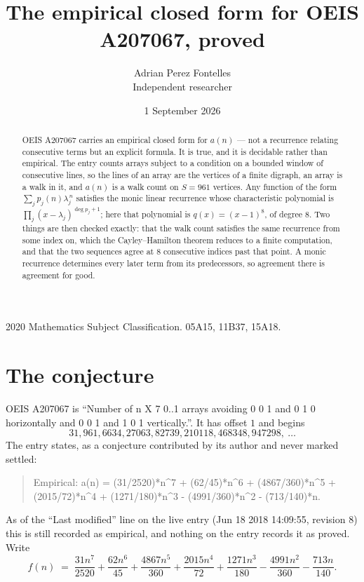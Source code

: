 \documentclass[11pt,a4paper]{article}
\title{The empirical closed form for OEIS A207067, proved}
\author{Adrian Perez Fontelles\\ \small Independent researcher}
\date{1 September 2026}
\theoremstyle{plain}
\theoremstyle{definition}
\begin{document}
\maketitle

\begin{abstract}
OEIS A207067 carries an empirical closed form for $a(n)$ --- not a recurrence relating
consecutive terms but an explicit formula. It is true, and it is decidable rather than
empirical. The entry counts arrays subject to a condition on a bounded window of consecutive lines, so the lines of an array are the
vertices of a finite digraph, an array is a walk in it, and $a(n)$ is a walk count on
$S=961$ vertices. Any function of the form $\sum_j p_j(n)\lambda_j^{\,n}$ satisfies the
monic linear recurrence whose characteristic polynomial is
$\prod_j(x-\lambda_j)^{\deg p_j+1}$; here that polynomial is $q(x)=(x-1)^{8}$, of degree
$8$. Two things are then checked exactly: that the walk count satisfies the same
recurrence from some index on, which the Cayley--Hamilton theorem reduces to a finite
computation, and that the two sequences agree at $8$ consecutive indices past that
point. A monic recurrence determines every later term from its predecessors, so agreement
there is agreement for good.
\end{abstract}

\noindent\small 2020 Mathematics Subject Classification. 05A15, 11B37, 15A18.\normalsize

\section{The conjecture}

OEIS A207067 is ``Number of n X 7 0..1 arrays avoiding 0 0 1 and 0 1 0 horizontally and 0 0 1 and 1 0 1 vertically.''. It has offset $1$ and begins
\[
31, 961, 6634, 27063, 82739, 210118, 468348, 947298,\ \dots
\]
The entry states, as a conjecture contributed by its author and never marked settled:
\begin{quote}
Empirical: a(n) = (31/2520)*n\^{}7 + (62/45)*n\^{}6 + (4867/360)*n\^{}5 + (2015/72)*n\^{}4 + (1271/180)*n\^{}3 - (4991/360)*n\^{}2 - (713/140)*n.
\end{quote}
As of the ``Last modified'' line on the live entry (Jun 18 2018 14:09:55, revision 8) this is still
recorded as empirical, and nothing on the entry records it as proved. Write
\[
f(n)\;=\;\frac{31 n^{7}}{2520} + \frac{62 n^{6}}{45} + \frac{4867 n^{5}}{360} + \frac{2015 n^{4}}{72} + \frac{1271 n^{3}}{180} - \frac{4991 n^{2}}{360} - \frac{713 n}{140}.
\]
\end{document}
